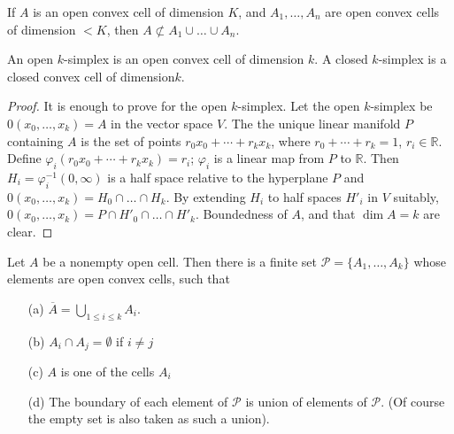 \begin{ex}\label{chap1-ex1.5.2}
If $A$ is an open convex cell of dimension $K$, and $A_{1},\ldots,A_{n}$ are open convex cells of dimension $<K$, then $A\not\subset A_{1}\cup \ldots \cup A_{n}$. 
\end{ex}

\begin{proposition}\label{chap1-prop1.5.3}
An open $k$-simplex is an open convex cell of dimension $k$. A closed $k$-simplex is a closed convex cell of dimension\pageoriginale $k$.
\end{proposition}

\begin{proof}
It is enough to prove for the open $k$-simplex. Let the open $k$-simplex be $0(x_{0},\ldots,x_{k})=A$ in the vector space $V$. The the unique linear manifold $P$ containing $A$ is the set of points $r_{0}x_{0}+\cdots+r_{k}x_{k}$, where $r_{0}+\cdots+r_{k}=1$, $r_{i}\in \mathbb{R}$. Define $\varphi_{i}(r_{0}x_{0}+\cdots+r_{k}x_{k})=r_{i}$; $\varphi_{i}$ is a linear map from $P$ to $\mathbb{R}$. Then $H_{i}=\varphi^{-1}_{i}(0,\infty)$ is a half space relative to the hyperplane $P$ and $0(x_{0},\ldots,x_{k})=H_{0}\cap \ldots\cap H_{k}$. By extending $H_{i}$ to half spaces $H'_{i}$ in $V$ suitably, $0(x_{0},\ldots,x_{k})=P\cap H'_{0}\cap \ldots\cap H'_{k}$. Boundedness of $A$,   and that $\dim A=k$ are clear.
\end{proof}

\begin{proposition}\label{chap1-prop1.5.4}
Let $A$ be a nonempty open cell. Then there is a finite set $\mathscr{P}=\{A_{1},\ldots,A_{k}\}$ whose elements are open convex cells, such that
\begin{itemize}
\item[\rm(a)] $\overline{A}=\bigcup\limits_{1\leq i\leq k}A_{i}$.

\item[\rm(b)] $A_{i}\cap A_{j}=\emptyset$ if $i\neq j$

\item[\rm(c)] $A$ is one of the cells $A_{i}$

\item[\rm(d)] The boundary of each element of $\mathscr{P}$ is union of elements of $\mathscr{P}$. (Of course the empty set is also taken as such a union). 
\end{itemize}
\end{proposition}

